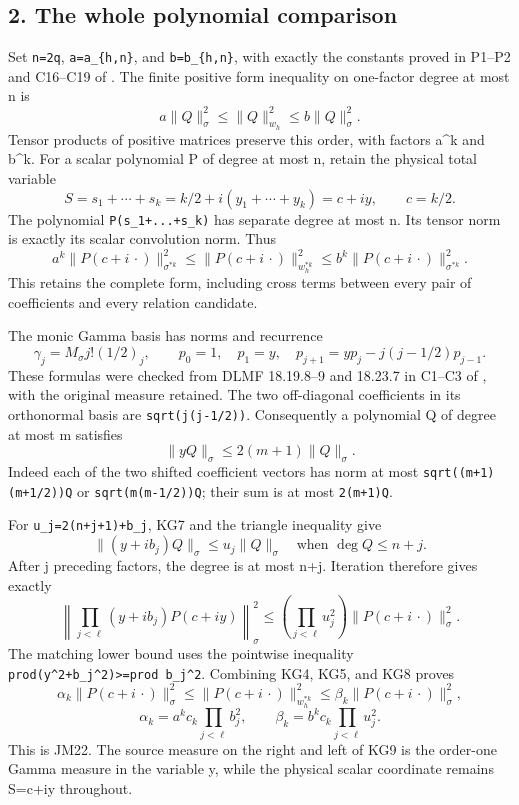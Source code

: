 \documentclass[11pt]{article}
\begin{document}
\subsection{2. The whole polynomial comparison}\label{mrkg:the-whole-polynomial-comparison}

Set \texttt{n=2q}, \texttt{a=a\_\{h,n\}}, and \texttt{b=b\_\{h,n\}}, with exactly the constants proved in P1--P2 and C16--C19 of . The finite positive form inequality on one-factor degree at most n is \[
a\|Q\|_\sigma^2\le\|Q\|_{w_h}^2\le b\|Q\|_\sigma^2.
\] Tensor products of positive matrices preserve this order, with factors a\^{}k and b\^{}k. For a scalar polynomial P of degree at most n, retain the physical total variable \[
S=s_1+\cdots+s_k=k/2+i(y_1+\cdots+y_k)=c+iy,
\qquad c=k/2.
\] The polynomial \texttt{P(s\_1+...+s\_k)} has separate degree at most n. Its tensor norm is exactly its scalar convolution norm. Thus \[
a^k\|P(c+i\,\cdot)\|_{\sigma^{*k}}^2
\le\|P(c+i\,\cdot)\|_{w_h^{*k}}^2
\le b^k\|P(c+i\,\cdot)\|_{\sigma^{*k}}^2.
\tag{KG5}
\] This retains the complete form, including cross terms between every pair of coefficients and every relation candidate.

The monic Gamma basis has norms and recurrence \[
\gamma_j=M_\sigma j!(1/2)_j,\qquad
p_0=1,\quad p_1=y,\quad
p_{j+1}=yp_j-j(j-1/2)p_{j-1}.
\tag{KG6}
\] These formulas were checked from DLMF 18.19.8--9 and 18.23.7 in C1--C3 of , with the original measure retained. The two off-diagonal coefficients in its orthonormal basis are \texttt{sqrt(j(j-1/2))}. Consequently a polynomial Q of degree at most m satisfies \[
\|yQ\|_\sigma\le2(m+1)\|Q\|_\sigma.
\tag{KG7}
\] Indeed each of the two shifted coefficient vectors has norm at most \texttt{sqrt((m+1)(m+1/2))\textbar{}\textbar{}Q\textbar{}\textbar{}} or \texttt{sqrt(m(m-1/2))\textbar{}\textbar{}Q\textbar{}\textbar{}}; their sum is at most \texttt{2(m+1)\textbar{}\textbar{}Q\textbar{}\textbar{}}.

For \texttt{u\_j=2(n+j+1)+b\_j}, KG7 and the triangle inequality give \[
\|(y+ib_j)Q\|_\sigma\le u_j\|Q\|_\sigma
\quad\text{when }\deg Q\le n+j.
\] After j preceding factors, the degree is at most n+j. Iteration therefore gives exactly \[
\left\|\prod_{j<\ell}(y+ib_j)P(c+iy)\right\|_\sigma^2
\le\left(\prod_{j<\ell}u_j^2\right)
\|P(c+i\,\cdot)\|_\sigma^2.
\tag{KG8}
\] The matching lower bound uses the pointwise inequality \texttt{prod(y\^{}2+b\_j\^{}2)\textgreater{}=prod\ b\_j\^{}2}. Combining KG4, KG5, and KG8 proves \[
\boxed{\alpha_k\|P(c+i\,\cdot)\|_\sigma^2
\le\|P(c+i\,\cdot)\|_{w_h^{*k}}^2
\le\beta_k\|P(c+i\,\cdot)\|_\sigma^2,}
\tag{KG9}
\] \[
\alpha_k=a^kc_k\prod_{j<\ell}b_j^2,\qquad
\beta_k=b^kc_k\prod_{j<\ell}u_j^2.
\] This is JM22. The source measure on the right and left of KG9 is the order-one Gamma measure in the variable y, while the physical scalar coordinate remains S=c+iy throughout.
\end{document}

